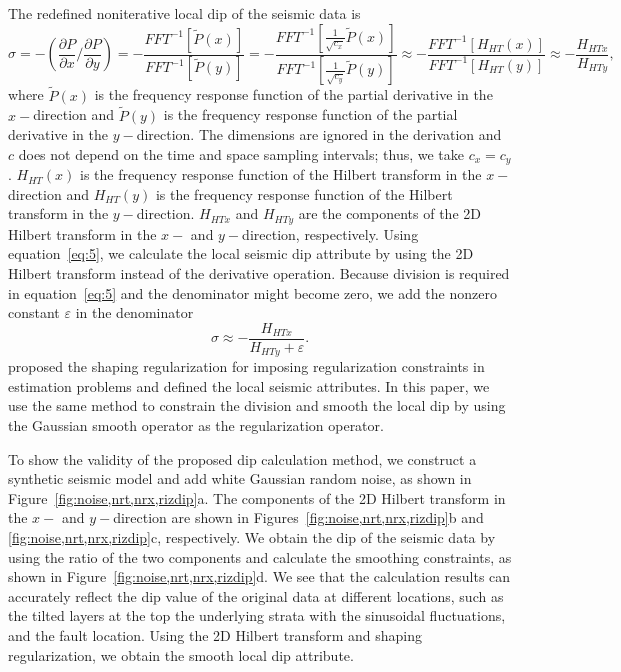 The redefined noniterative local dip of the seismic data is
\begin{equation}
  \label{eq:5}
  {\sigma} =-(\frac{\partial{P}}{\partial{x}}{\slash}
       \frac{\partial{P}}{\partial{y}})=
       -\frac{{FFT^{-1}}{[\tilde{P}(x)]}}{{FFT^{-1}}{[\tilde{P}(y)]}}
       =-\frac{FFT^{-1}[\frac{1}{\sqrt{c_{x}}}\tilde{P}(x)]}{FFT^{-1}
         [\frac{1}{\sqrt{c_{y}}}\tilde{P}(y)]}{\approx}-\frac{FFT^{-1}
         [H_{HT}(x)]}{FFT^{-1}[H_{HT}(y)]}{\approx}-\frac{H_{HTx}}{H_{HTy}},
\end{equation}
where $\tilde{P}(x)$ is the frequency response function of the partial
derivative in the $x-$direction and $\tilde{P}(y)$ is the frequency
response function of the partial derivative in the $y-$direction. The
dimensions are ignored in the derivation and $c$ does not depend on
the time and space sampling intervals; thus, we take
$c_x=c_y$. $H_{HT}(x)$ is the frequency response function of the
Hilbert transform in the $x-$direction and $H_{HT}(y)$ is the
frequency response function of the Hilbert transform in the
$y-$direction. $H_{HTx}$ and $H_{HTy}$ are the components of the 2D
Hilbert transform in the $x-$ and $y-$direction, respectively. Using
equation~\ref{eq:5}, we calculate the local seismic dip attribute by
using the 2D Hilbert transform instead of the derivative operation.
Because division is required in equation~\ref{eq:5} and the
denominator might become zero, we add the nonzero constant
$\varepsilon$ in the denominator
\begin{equation}
  \label{eq:6}
  \sigma{\approx}-\frac{H_{HTx}}{H_{HTy}+\varepsilon}.
\end{equation}
\cite{Fomel07} proposed the shaping regularization
for imposing regularization constraints in estimation problems and
defined the local seismic attributes. In this paper, we use the same
method to constrain the division and smooth the local dip by using the
Gaussian smooth operator as the regularization operator.


To show the validity of the proposed dip calculation method, we
construct a synthetic seismic model and add white Gaussian random
noise, as shown in Figure~\ref{fig:noise,nrt,nrx,rizdip}a.  The
components of the 2D Hilbert transform in the $x-$ and $y-$direction
are shown in Figures~\ref{fig:noise,nrt,nrx,rizdip}b and
\ref{fig:noise,nrt,nrx,rizdip}c, respectively. We obtain the dip of
the seismic data by using the ratio of the two components and
calculate the smoothing constraints, as shown in
Figure~\ref{fig:noise,nrt,nrx,rizdip}d. We see that the calculation
results can accurately reflect the dip value of the original data at
different locations, such as the tilted layers at the top the
underlying strata with the sinusoidal fluctuations, and the fault
location. Using the 2D Hilbert transform and shaping regularization,
we obtain the smooth local dip attribute.

